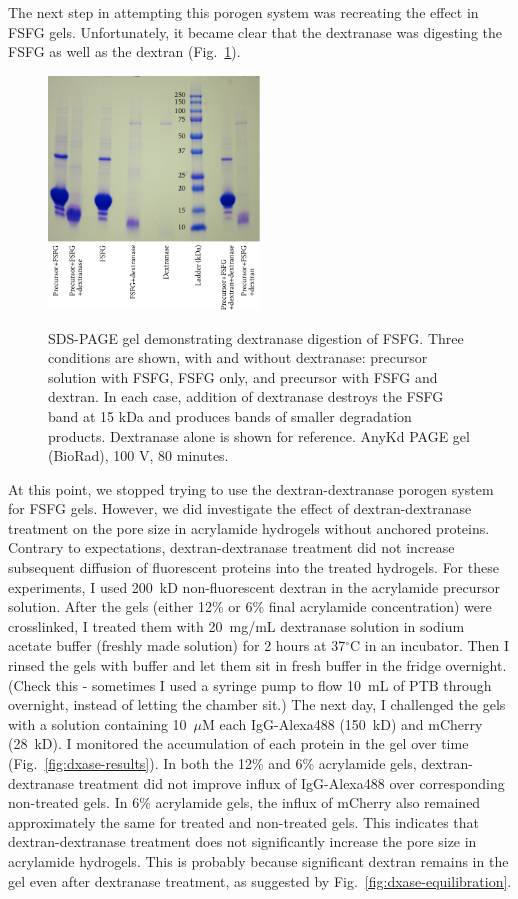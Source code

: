 The next step in attempting this porogen system was recreating the effect in FSFG gels.  Unfortunately, it became clear that the dextranase was digesting the FSFG as well as the dextran (Fig.~\ref{fig:dxase-FSFG}).  
\begin{figure} %
\caption{SDS-PAGE gel demonstrating dextranase digestion of FSFG.  Three conditions are shown, with and without dextranase: precursor solution with FSFG, FSFG only, and precursor with FSFG and dextran.  In each case, addition of dextranase destroys the FSFG band at 15 kDa and produces bands of smaller degradation products.  Dextranase alone is shown for reference.  AnyKd PAGE gel (BioRad), 100 V, 80 minutes.\\}
\centering
\includegraphics[width=0.5\textwidth]{figs/ch03/FSFG+dxase_PAGE}
\label{fig:dxase-FSFG}
\end{figure}
 At this point, we stopped trying to use the dextran-dextranase porogen system for FSFG gels.  However, we did investigate the effect of dextran-dextranase treatment on the pore size in acrylamide hydrogels without anchored proteins.  Contrary to expectations, dextran-dextranase treatment did not increase subsequent diffusion of fluorescent proteins into the treated hydrogels.  For these experiments, I used 200~kD non-fluorescent dextran in the acrylamide precursor solution.  After the gels (either 12\% or 6\% final acrylamide concentration) were crosslinked, I treated them with 20~mg/mL dextranase solution in sodium acetate buffer (freshly made solution) for 2 hours at 37$^\circ$C in an incubator.  Then I rinsed the gels with buffer and let them sit in fresh buffer in the fridge overnight.  (Check this - sometimes I used a syringe pump to flow 10~mL of PTB through overnight, instead of letting the chamber sit.) The next day, I challenged the gels with a solution containing 10~$\mu$M each IgG-Alexa488 (150~kD) and mCherry (28~kD).  I monitored the accumulation of each protein in the gel over time (Fig.~\ref{fig:dxase-results}).  In both the 12\% and 6\% acrylamide gels, dextran-dextranase treatment did not improve influx of IgG-Alexa488 over corresponding non-treated gels.  In 6\% acrylamide gels, the influx of mCherry also remained approximately the same for treated and non-treated gels.  This indicates that dextran-dextranase treatment does not significantly increase the pore size in acrylamide hydrogels.  This is probably because significant dextran remains in the gel even after dextranase treatment, as suggested by Fig.~\ref{fig:dxase-equilibration}.
